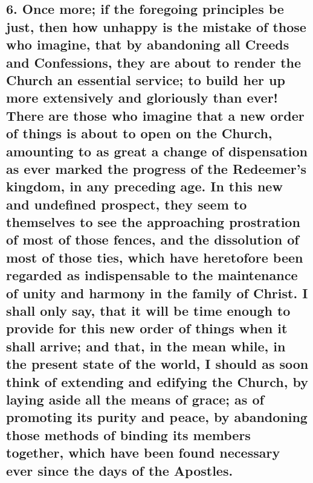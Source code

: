 \documentclass[
]{book}
\begin{document}
{\subsection{6. Once more; if the foregoing principles be just, then how unhappy is the mistake of those who imagine, that by abandoning all Creeds and Confessions, they are about to render the Church an essential service; to build her up more extensively and gloriously than ever! There are those who imagine that a new order of things is about to open on the Church, amounting to as great a change of dispensation as ever marked the progress of the Redeemer's kingdom, in any preceding age. In this new and undefined prospect, they seem to themselves to see the approaching prostration of most of those fences, and the dissolution of most of those ties, which have heretofore been regarded as indispensable to the maintenance of unity and harmony in the family of Christ. I shall only say, that it will be time enough to provide for this new order of things when it shall arrive; and that, in the mean while, in the present state of the world, I should as soon think of extending and edifying the Church, by laying aside all the means of grace; as of promoting its purity and peace, by abandoning those methods of binding its members together, which have been found necessary ever since the days of the Apostles.}\label{once-more-if-the-foregoing-principles-be-just-then-how-unhappy-is-the-mistake-of-those-who-imagine-that-by-abandoning-all-creeds-and-confessions-they-are-about-to-render-the-church-an-essential-service-to-build-her-up-more-extensively-and-gloriously-than-ever-there-are-those-who-imagine-that-a-new-order-of-things-is-about-to-open-on-the-church-amounting-to-as-great-a-change-of-dispensation-as-ever-marked-the-progress-of-the-redeemers-kingdom-in-any-preceding-age.-in-this-new-and-undefined-prospect-they-seem-to-themselves-to-see-the-approaching-prostration-of-most-of-those-fences-and-the-dissolution-of-most-of-those-ties-which-have-heretofore-been-regarded-as-indispensable-to-the-maintenance-of-unity-and-harmony-in-the-family-of-christ.-i-shall-only-say-that-it-will-be-time-enough-to-provide-for-this-new-order-of-things-when-it-shall-arrive-and-that-in-the-mean-while-in-the-present-state-of-the-world-i-should-as-soon-think-of-extending-and-edifying-the-church-by-laying-aside-all-the-means-of-grace-as-of-promoting-its-purity-and-peace-by-abandoning-those-methods-of-binding-its-members-together-which-have-been-found-necessary-ever-since-the-days-of-the-apostles.}}
\end{document}
